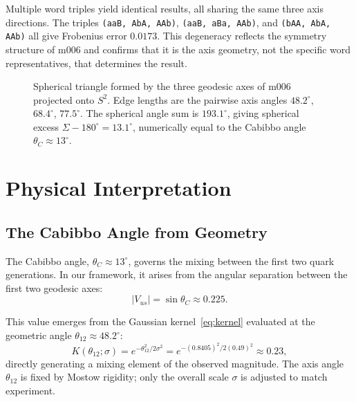 \documentclass[11pt,a4paper]{article}
\begin{document}
Multiple word triples yield identical results, all sharing the 
same three axis directions. The triples \texttt{(aaB, AbA, AAb)}, 
\texttt{(aaB, aBa, AAb)}, and \texttt{(bAA, AbA, AAb)} all give 
Frobenius error $0.0173$. This degeneracy reflects the symmetry
structure of m006 and confirms that it is the axis geometry,
not the specific word representatives, that determines the result.

\begin{figure}[h]
\centering
\caption{Spherical triangle formed by the three geodesic axes of m006
projected onto $S^2$. Edge lengths are the pairwise axis angles
$48.2^\circ$, $68.4^\circ$, $77.5^\circ$. The spherical angle sum
is $193.1^\circ$, giving spherical excess $\Sigma - 180^\circ = 13.1^\circ$,
numerically equal to the Cabibbo angle $\theta_C \approx 13^\circ$.}
\label{fig:triangle}
\end{figure}

\section{Physical Interpretation}
\label{sec:physics}

\subsection{The Cabibbo Angle from Geometry}
\label{subsec:cabibbo}

The Cabibbo angle, $\theta_C \approx 13^\circ$, governs the mixing between 
the first two quark generations. In our framework, it arises from the 
angular separation between the first two geodesic axes:
\begin{equation}
|V_{us}| = \sin\theta_C \approx 0.225.
\end{equation}

This value emerges from the Gaussian kernel~\eqref{eq:kernel}
evaluated at the geometric angle $\theta_{12} \approx 48.2^\circ$:
\begin{equation}
K(\theta_{12};\sigma) = e^{-\theta_{12}^2/2\sigma^2}
= e^{-(0.8405)^2/2(0.49)^2} \approx 0.23,
\end{equation}
directly generating a mixing element of the observed magnitude.
The axis angle $\theta_{12}$ is fixed by Mostow rigidity; only
the overall scale $\sigma$ is adjusted to match experiment.
\end{document}
